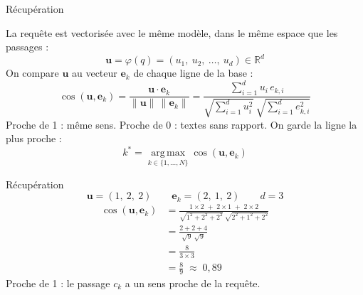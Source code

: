 \documentclass{beamer}
\begin{document}
\begin{frame}{Récupération}
  \centering

  \raggedright
  \small
  La requête est vectorisée avec le même modèle, dans le même espace que les passages :
  \begin{equation*}
    \mathbf{u} = \varphi(q) = (u_1,\ u_2,\ \dots,\ u_d) \in \mathbb{R}^{d}
  \end{equation*}
  On compare $\mathbf{u}$ au vecteur $\mathbf{e}_k$ de chaque ligne de la base :
  \begin{equation*}
    \cos(\mathbf{u}, \mathbf{e}_k) = \frac{\mathbf{u} \cdot \mathbf{e}_k}{\|\mathbf{u}\|\,\|\mathbf{e}_k\|}
    = \frac{\sum_{i=1}^{d} u_i\, e_{k,i}}{\sqrt{\sum_{i=1}^{d} u_i^2}\ \sqrt{\sum_{i=1}^{d} e_{k,i}^2}}
  \end{equation*}
  {\footnotesize Proche de 1 : même sens. Proche de 0 : textes sans rapport. On garde la ligne la plus proche :}
  \[ k^* = \operatorname*{arg\,max}_{k \in \{1, \dots, N\}} \cos(\mathbf{u}, \mathbf{e}_k) \]
\end{frame}

\begin{frame}{Récupération}
  \centering
  \[ \mathbf{u} = (1,\ 2,\ 2) \qquad \mathbf{e}_k = (2,\ 1,\ 2) \qquad d = 3 \]
  \vspace{0.5em}
  \begin{align*}
    \cos(\mathbf{u}, \mathbf{e}_k)
      &= \frac{1 \times 2 \;+\; 2 \times 1 \;+\; 2 \times 2}{\sqrt{1^2 + 2^2 + 2^2}\ \sqrt{2^2 + 1^2 + 2^2}} \\[6pt]
      &= \frac{2 + 2 + 4}{\sqrt{9}\ \sqrt{9}} \\[6pt]
      &= \frac{8}{3 \times 3} \\[6pt]
      &= \frac{8}{9} \;\approx\; 0{,}89
  \end{align*}
  \vspace{0.5em}
  {\footnotesize Proche de 1 : le passage $c_k$ a un sens proche de la requête.}
\end{frame}
\end{document}
